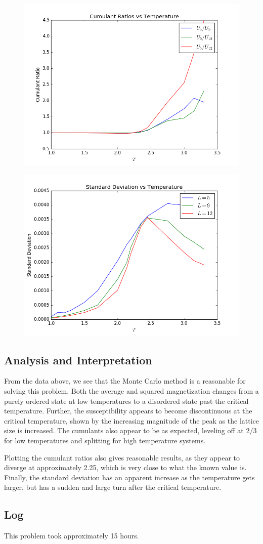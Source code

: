 \documentclass[10pt,letter]{article}
\begin{document}
\begin{figure}[H]
  \centering
    \includegraphics[width=.6\textwidth]{homework9_problem1_plot5}
\end{figure}
\begin{figure}[H]
  \centering
    \includegraphics[width=.6\textwidth]{homework9_problem1_plot6}
\end{figure}
\subsection{Analysis and Interpretation}

From the data above, we see that the Monte Carlo method is a reasonable for solving this problem. Both the average and squared magnetization changes from a purely ordered state at low temperatures to a disordered state past the critical temperature. Further, the susceptibility appears to become discontinuous at the critical temperature, shown by the increasing magnitude of the peak as the lattice size is increased. The cumulants also appear to be as expected, leveling off at $2/3$ for low temperatures and splitting for high temperature systems.

Plotting the cumulant ratios also gives reasonable results, as they appear to diverge at approximately 2.25, which is very close to what the known value is. Finally, the standard deviation has an apparent increase as the temperature gets larger, but has a sudden and large turn after the critical temperature.

\subsection{Log}

This problem took approximately 15 hours.
\end{document}
